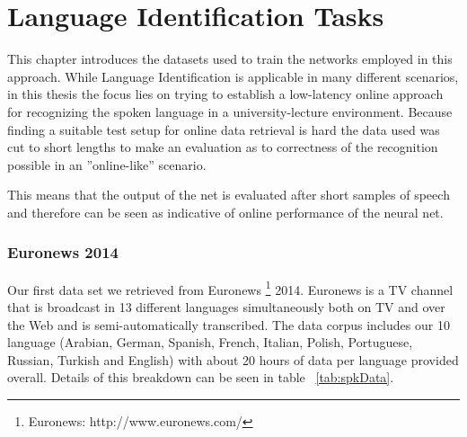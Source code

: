 



\chapter{Language Identification Tasks}
\label{ch:LITasks}
This chapter introduces the datasets used to train the networks employed in this approach. While Language Identification is applicable in many different scenarios, in this thesis the focus lies on trying to establish a low-latency online approach for recognizing the spoken language in a university-lecture environment. Because finding a suitable test setup for online data retrieval is hard the data used was cut to short lengths to make an evaluation as to correctness of the recognition possible in an ''online-like'' scenario. 

This means that the output of the net is evaluated after short samples of speech and therefore can be seen as indicative of online performance of the neural net.

\subsection{Euronews 2014}
\label{sec:LITasks:Euronews}
Our first data set we retrieved from Euronews \footnote{Euronews: http://www.euronews.com/} 2014. Euronews is a TV channel that is broadcast in 13 different languages simultaneously both on TV and over the Web and is semi-automatically transcribed. The data corpus includes our 10 language (Arabian, German, Spanish, French, Italian, Polish, Portuguese, Russian, Turkish and English)  with about 20 hours of data per language provided overall. Details of this breakdown can be seen in table ~\ref{tab:spkData}.

